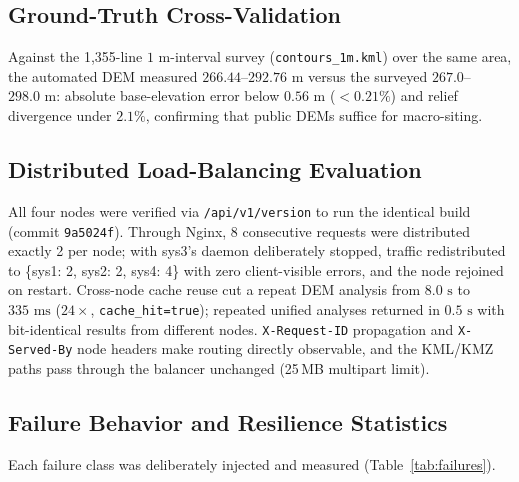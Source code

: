 \documentclass[manuscript,screen,review]{acmart}
\begin{document}
\subsection{Ground-Truth Cross-Validation}
Against the 1,355-line $1\text{ m}$-interval survey (\texttt{contours\_1m.kml}) over the same area, the automated DEM measured $266.44$--$292.76\text{ m}$ versus the surveyed $267.0$--$298.0\text{ m}$: absolute base-elevation error below $0.56\text{ m}$ ($<0.21\%$) and relief divergence under $2.1\%$, confirming that public DEMs suffice for macro-siting.

\subsection{Distributed Load-Balancing Evaluation}
All four nodes were verified via \texttt{/api/v1/version} to run the identical build (commit \texttt{9a5024f}). Through Nginx, 8 consecutive requests were distributed exactly 2 per node; with sys3's daemon deliberately stopped, traffic redistributed to \{sys1: 2, sys2: 2, sys4: 4\} with zero client-visible errors, and the node rejoined on restart. Cross-node cache reuse cut a repeat DEM analysis from $8.0\text{ s}$ to $335\text{ ms}$ ($24\times$, \texttt{cache\_hit=true}); repeated unified analyses returned in $0.5\text{ s}$ with bit-identical results from different nodes. \texttt{X-Request-ID} propagation and \texttt{X-Served-By} node headers make routing directly observable, and the KML/KMZ paths pass through the balancer unchanged (25\,MB multipart limit).

\subsection{Failure Behavior and Resilience Statistics}
Each failure class was deliberately injected and measured (Table~\ref{tab:failures}).
\end{document}
